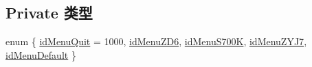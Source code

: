 \subsection*{Private 类型}
\begin{DoxyCompactItemize}
\item 
enum \{ \newline
\hyperlink{classmonitor_client_frame_a06fc87d81c62e9abb8790b6e5713c55ba36b0ac076d9b564b352f2553f7ef1d7b}{id\+Menu\+Quit} = 1000, 
\hyperlink{classmonitor_client_frame_a06fc87d81c62e9abb8790b6e5713c55ba437046a5ae2fed1c4c7280150d6a4e65}{id\+Menu\+Z\+D6}, 
\hyperlink{classmonitor_client_frame_a06fc87d81c62e9abb8790b6e5713c55ba9f79c10983afed571c6d00e84ee74a19}{id\+Menu\+S700K}, 
\hyperlink{classmonitor_client_frame_a06fc87d81c62e9abb8790b6e5713c55ba3d5c723e654a5ef4f3eb5c7ceeffdead}{id\+Menu\+Z\+Y\+J7}, 
\newline
\hyperlink{classmonitor_client_frame_a06fc87d81c62e9abb8790b6e5713c55ba7dc2fd7f86d8ef6bed6b3eadcefae015}{id\+Menu\+Default}
 \}
\end{DoxyCompactItemize}
